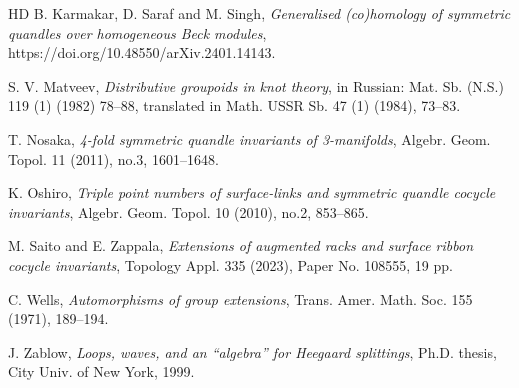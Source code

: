 \documentclass[11pt,reqno]{amsart}
\theoremstyle{definition}
\numberwithin{equation}{subsection}
\begin{document}
\begin{thebibliography}{HD}
     B. Karmakar, D. Saraf and M. Singh, \textit{Generalised (co)homology of symmetric quandles over homogeneous Beck modules},     https://doi.org/10.48550/arXiv.2401.14143.
    		
	 S. V. Matveev, \textit{Distributive groupoids in knot theory}, in Russian: Mat. Sb. (N.S.) 119 (1) (1982) 78--88, translated in Math. USSR Sb. 47 (1) (1984), 73--83.
	
	 T. Nosaka, \textit{ 4-fold symmetric quandle invariants of 3-manifolds}, Algebr. Geom. Topol. 11 (2011), no.3, 1601--1648.
	
	 K. Oshiro, \textit{Triple point numbers of surface-links and symmetric quandle cocycle invariants},  Algebr. Geom. Topol. 10 (2010), no.2, 853--865.
	
	 M. Saito and E. Zappala, \textit{Extensions of augmented racks and surface ribbon cocycle invariants}, Topology Appl. 335 (2023), Paper No. 108555, 19 pp.
	
	 C. Wells, \textit{Automorphisms of group extensions}, Trans. Amer. Math. Soc. 155 (1971), 189–194.
	
	 J. Zablow, \textit{Loops, waves, and an ``algebra'' for Heegaard splittings}, Ph.D. thesis, City Univ. of New York, 1999. 
	
\end{thebibliography}	
\end{document}
